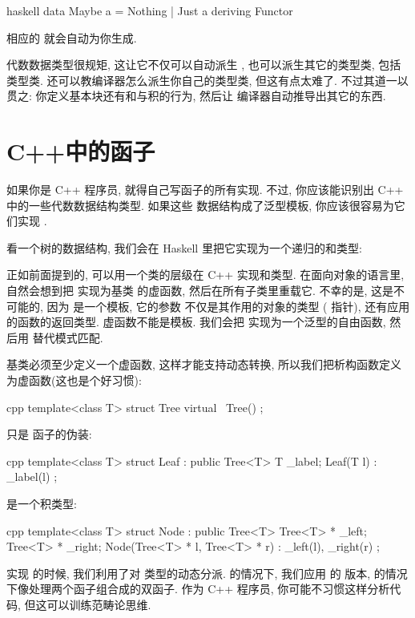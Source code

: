 \begin{snip}{haskell}
data Maybe a = Nothing | Just a deriving Functor
\end{snip}
相应的  就会自动为你生成.

代数数据类型很规矩, 这让它不仅可以自动派生 , 也可以派生其它的类型类, 包括  类型类.
还可以教编译器怎么派生你自己的类型类, 但这有点太难了. 不过其道一以贯之: 你定义基本块还有和与积的行为, 然后让
编译器自动推导出其它的东西.

\section{C++中的函子}

如果你是 C++ 程序员, 就得自己写函子的所有实现. 不过, 你应该能识别出 C++ 中的一些代数数据结构类型. 如果这些
数据结构成了泛型模板, 你应该很容易为它们实现 .

看一个树的数据结构, 我们会在 Haskell 里把它实现为一个递归的和类型:

正如前面提到的, 可以用一个类的层级在 C++ 实现和类型. 在面向对象的语言里, 自然会想到把  实现为基类
 的虚函数, 然后在所有子类里重载它. 不幸的是, 这是不可能的, 因为  是一个模板, 它的参数
不仅是其作用的对象的类型 ( 指针), 还有应用的函数的返回类型. 虚函数不能是模板. 我们会把 
实现为一个泛型的自由函数, 然后用  替代模式匹配.

基类必须至少定义一个虚函数, 这样才能支持动态转换, 所以我们把析构函数定义为虚函数(这也是个好习惯):

\begin{snip}{cpp}
template<class T>
struct Tree {
    virtual ~Tree() {}
};
\end{snip}
 只是  函子的伪装:

\begin{snip}{cpp}
template<class T>
struct Leaf : public Tree<T> {
    T _label;
    Leaf(T l) : _label(l) {}
};
\end{snip}
 是一个积类型:

\begin{snip}{cpp}
template<class T>
struct Node : public Tree<T> {
    Tree<T> * _left;
    Tree<T> * _right;
    Node(Tree<T> * l, Tree<T> * r) : _left(l), _right(r) {}
};
\end{snip}
实现  的时候, 我们利用了对  类型的动态分派.  的情况下, 我们应用  的
 版本,  的情况下像处理两个函子组合成的双函子. 作为 C++ 程序员, 你可能不习惯这样分析代码,
但这可以训练范畴论思维.


